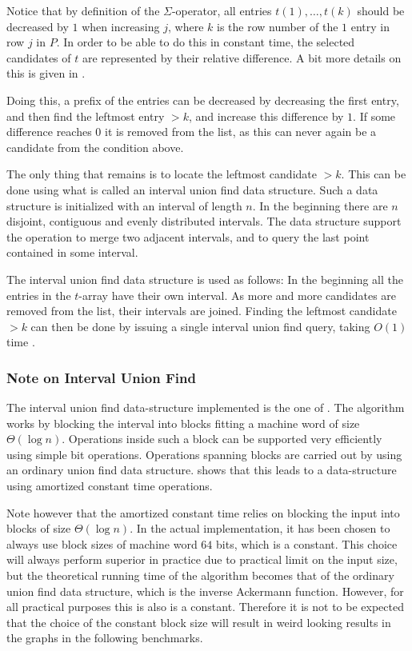 \documentclass[twoside,11pt,openright]{report}
\begin{document}
Notice that by definition of the $\Sigma$-operator, all entries $t(1), \dots, t(k)$ should be decreased by $1$ when increasing $j$, where $k$ is the row number of the $1$ entry in row $j$ in $P$. In order to be able to do this in constant time, the selected candidates of $t$ are represented by their relative difference. A bit more details on this is given in \cite[Lemma 2, p. 234]{Gawrychowski:2012:FAC:2422024.2422048}.

Doing this, a prefix of the entries can be decreased by decreasing the first entry, and then find the leftmost entry $> k$, and increase this difference by $1$. If some difference reaches $0$ it is removed from the list, as this can never again be a candidate from the condition above.

The only thing that remains is to locate the leftmost candidate $> k$. This can be done using what is called an interval union find data structure. Such a data structure is initialized with an interval of length $n$. In the beginning there are $n$ disjoint, contiguous and evenly distributed intervals. The data structure support the operation to merge two adjacent intervals, and to query the last point contained in some interval.

The interval union find data structure is used as follows: In the beginning all the entries in the $t$-array have their own interval. As more and more candidates are removed from the list, their intervals are joined. Finding the leftmost candidate $> k$ can then be done by issuing a single interval union find query, taking $O(1)$ time \cite{Itai06lineartime}.

\subsubsection{Note on Interval Union Find}
\label{sec:algorithm:interval-union-find}
The interval union find data-structure implemented is the one of \cite{Itai06lineartime}. The algorithm works by blocking the interval into blocks fitting a machine word of size $\Theta(\log{n})$. Operations inside such a block can be supported very efficiently using simple bit operations. Operations spanning blocks are carried out by using an ordinary union find data structure. \cite{Itai06lineartime} shows that this leads to a data-structure using amortized constant time operations.

 Note however that the amortized constant time relies on blocking the input into blocks of size $\Theta(\log{n})$. In the actual implementation, it has been chosen to always use block sizes of machine word $64$ bits, which is a constant. This choice will always perform superior in practice due to practical limit on the input size, but the theoretical running time of the algorithm becomes that of the ordinary union find data structure, which is the inverse Ackermann function. However, for all practical purposes this is also is a constant. Therefore it is not to be expected that the choice of the constant block size will result in weird looking results in the graphs in the following benchmarks.
\end{document}
